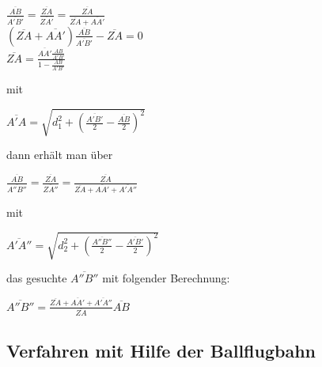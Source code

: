 \documentclass{ezb}
\begin{document}
\begin{center}
$\frac{\overline{AB}}{\overline{A'B'}} = \frac{\overline{ZA}}{\overline{ZA'}} = \frac{\overline{ZA}}{\overline{ZA}+\overline{AA'}}$\\ \vspace{0.5cm}
$(\overline{ZA}+\overline{AA'})\frac{\overline{AB}}{\overline{A'B'}}-\overline{ZA}=0$\\ \vspace{0.5cm}
$\overline{ZA}=\frac{\overline{AA'}\frac{AB}{A'B'}}{1-\frac{AB}{A'B'}}$
\end{center}
mit
\begin{center}
$\overline{A'A} = \sqrt{d_{1}^{2}+(\frac{\overline{A'B'}}{2}-\frac{\overline{AB}}{{2}})^{2}}$\\
\end{center}
dann erhält man über
\begin{center}
$\frac{\overline{AB}}{\overline{A''B''}} = \frac{\overline{ZA}}{\overline{ZA''}} = \frac{\overline{ZA}}{\overline{ZA}+\overline{AA'}+\overline{A'A''}} $\\
\end{center}
mit
\begin{center}
$\overline{A'A''} = \sqrt{d_{2}^{2}+(\frac{\overline{A''B''}}{2}-\frac{\overline{A'B'}}{{2}})^{2}}$\\
\end{center}
das gesuchte $\overline{A''B''}$ mit folgender Berechnung:\\
\begin{center}
$\overline{A''B''} = \frac{\overline{ZA}+\overline{AA'}+\overline{A'A''}}{\overline{ZA}}\overline{AB}$
\end{center}
\subsection{Verfahren mit Hilfe der Ballflugbahn}
\end{document}
